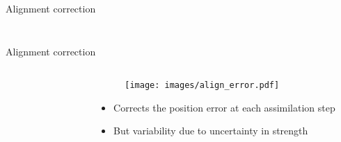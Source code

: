 \documentclass[aspectratio=169]{beamer} %
\begin{document}
\begin{frame}{Alignment correction}
\begin{columns}[c]
\begin{column}{0.55\textwidth}
\begin{figure}[c]
\begin{subfigure}{0.49\textwidth}
                \end{subfigure}
            \end{figure}
        \end{column}
    \end{columns}

    \vspace{-0.25cm}

    \vspace{-0.25cm}
\end{frame}


\begin{frame}{Alignment correction}
    \vspace{-0.5cm}
    \begin{columns}
        \begin{column}{0.5\textwidth}
            \begin{figure}
                \centering
            \end{figure}
        \end{column}
        \begin{column}{0.5\textwidth}
            \begin{figure}
                \centering
                \texttt{[image: images/align\_error.pdf]}
            \end{figure}
            \begin{itemize}
                \item Corrects the position error at each assimilation step
                \item But variability due to uncertainty in strength
            \end{itemize}
        \end{column}
    \end{columns}
\end{frame}
\end{document}
